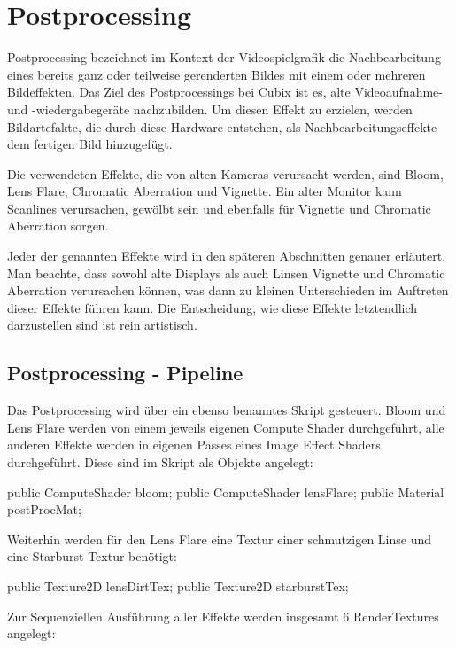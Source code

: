 
\section{Postprocessing}

Postprocessing bezeichnet im Kontext der Videospielgrafik die Nachbearbeitung eines bereits ganz oder teilweise gerenderten Bildes mit einem oder mehreren Bildeffekten. Das Ziel des Postprocessings bei Cubix ist es, alte Videoaufnahme- und -wiedergabegeräte nachzubilden. Um diesen Effekt zu erzielen, werden Bildartefakte, die durch diese Hardware entstehen, als Nachbearbeitungseffekte dem fertigen Bild hinzugefügt.

Die verwendeten Effekte, die von alten Kameras verursacht werden, sind Bloom, Lens Flare, Chromatic Aberration und Vignette. 
Ein alter Monitor kann Scanlines verursachen, gewölbt sein und ebenfalls für Vignette und Chromatic Aberration sorgen.

Jeder der genannten Effekte wird in den späteren Abschnitten genauer erläutert. Man beachte, dass sowohl alte Displays als auch Linsen Vignette und Chromatic Aberration verursachen können, was dann zu kleinen Unterschieden im Auftreten dieser Effekte führen kann. Die Entscheidung, wie diese Effekte letztendlich darzustellen sind ist rein artistisch.



\subsection{Postprocessing - Pipeline}

Das Postprocessing wird über ein ebenso benanntes Skript gesteuert. Bloom und Lens Flare werden von einem jeweils eigenen Compute Shader durchgeführt, alle anderen Effekte werden in eigenen Passes eines Image Effect Shaders durchgeführt. Diese sind im Skript als Objekte angelegt:

\begin{csh}
    public ComputeShader bloom;
    public ComputeShader lensFlare;
    public Material postProcMat;
\end{csh}

Weiterhin werden für den Lens Flare eine Textur einer schmutzigen Linse und eine Starburst Textur benötigt:

\begin{csh}
    public Texture2D lensDirtTex;
    public Texture2D starburstTex;
\end{csh}

Zur Sequenziellen Ausführung aller Effekte werden insgesamt 6 RenderTextures angelegt:

